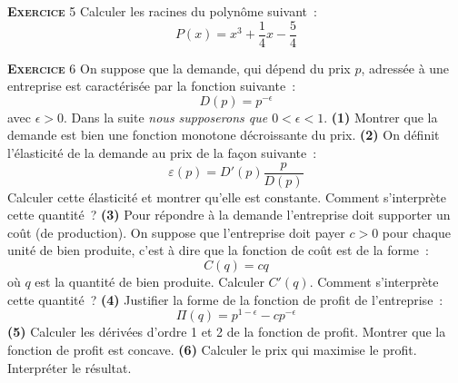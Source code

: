 \documentclass[10pt,a4paper,notitlepage,twocolumn]{article}
\newcommand{\exercice}[1]{\textsc{\textbf{Exercice}} #1}
\begin{document}
\bigskip

\exercice{5} Calculer les racines du polynôme suivant :
\[
P(x) = x^3 + \frac{1}{4}x - \frac{5}{4}
\]    

\bigskip

\exercice{6} On suppose que la demande, qui dépend du prix $p$, adressée à une entreprise est caractérisée par la fonction suivante :
\[
D(p) = p^{-\epsilon}
\]
avec $\epsilon>0$. Dans la suite \textit{nous supposerons que $0<\epsilon<1$}. \textbf{(1)} Montrer que la demande est bien une fonction monotone décroissante du prix. \textbf{(2)} On définit
l'élasticité de la demande au prix de la façon suivante :
\[
\varepsilon(p) = D'(p)\frac{p}{D(p)}
\]
Calculer cette élasticité et montrer qu'elle est constante. Comment s'interprète cette quantité ? \textbf{(3)} Pour répondre à la demande l'entreprise doit supporter un coût (de production). On suppose que l'entreprise doit payer $c>0$ pour chaque unité de bien produite, c'est à dire que la fonction de coût est de la forme :
\[
C(q) = cq
\]
où $q$ est la quantité de bien produite. Calculer $C'(q)$. Comment s'interprète cette quantité ? \textbf{(4)} Justifier la forme de la fonction de profit de l'entreprise :
\[
\Pi(q) = p^{1-\epsilon} - c p^{-\epsilon}
\]
\textbf{(5)} Calculer les dérivées d'ordre 1 et 2 de la fonction de profit. Montrer que la fonction de profit est concave. \textbf{(6)} Calculer le prix qui maximise le profit. Interpréter le résultat.
\end{document}
